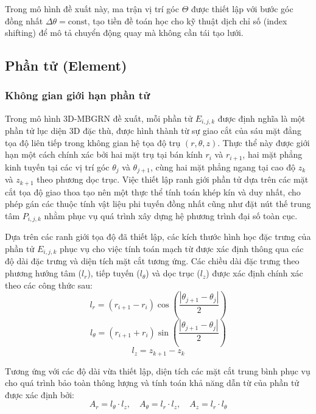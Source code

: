 Trong mô hình đề xuất này, ma trận vị trí góc $\Theta$ được thiết lập với bước góc đồng nhất $\Delta\theta = \text{const}$, tạo tiền đề toán học cho kỹ thuật dịch chỉ số (index shifting) để mô tả chuyển động quay mà không cần tái tạo lưới. 

\subsection{Phần tử (Element)}
\subsubsection{Không gian giới hạn phần tử}

Trong mô hình 3D-MBGRN đề xuất, mỗi phần tử $E_{i,j,k}$ được định nghĩa là một phần tử lục diện 3D đặc thù, được hình thành từ sự giao cắt của sáu mặt đẳng tọa độ liên tiếp trong không gian hệ tọa độ trụ $(r, \theta, z)$. Thực thể này được giới hạn một cách chính xác bởi hai mặt trụ tại bán kính $r_i$ và $r_{i+1}$, hai mặt phẳng kinh tuyến tại các vị trí góc $\theta_j$ và $\theta_{j+1}$, cùng hai mặt phẳng ngang tại cao độ $z_k$ và $z_{k+1}$ theo phương dọc trục. Việc thiết lập ranh giới phần tử dựa trên các mặt cắt tọa độ giao thoa tạo nên một thực thể tính toán khép kín và duy nhất, cho phép gán các thuộc tính vật liệu phi tuyến đồng nhất cũng như đặt nút thế trung tâm $P_{i,j,k}$ nhằm phục vụ quá trình xây dựng hệ phương trình đại số toàn cục.

Dựa trên các ranh giới tọa độ đã thiết lập, các kích thước hình học đặc trưng của phần tử $E_{i,j,k}$ phục vụ cho việc tính toán mạch từ được xác định thông qua các độ dài đặc trưng và diện tích mặt cắt tương ứng. Các chiều dài đặc trưng theo phương hướng tâm ($l_r$), tiếp tuyến ($l_\theta$) và dọc trục ($l_z$) được xác định chính xác theo các công thức sau:
\begin{equation}
    l_r = (r_{i+1} - r_i) \cos\left( \frac{|\theta_{j+1} - \theta_j|}{2} \right)
\end{equation}
\begin{equation}
    l_\theta = (r_{i+1} + r_i) \sin\left( \frac{|\theta_{j+1} - \theta_j|}{2} \right)
\end{equation}
\begin{equation}
    l_z = z_{k+1} - z_k
\end{equation}

Tương ứng với các độ dài vừa thiết lập, diện tích các mặt cắt trung bình phục vụ cho quá trình bảo toàn thông lượng và tính toán khả năng dẫn từ của phần tử được xác định bởi:
\begin{equation}
    A_r = l_\theta \cdot l_z, \quad A_\theta = l_r \cdot l_z, \quad A_z = l_r \cdot l_\theta
\end{equation}

